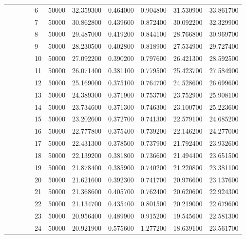 \begin{tabular}{llllllrrrrr}
\cline{5-11}
 &  &  &  & 6 & 50000 & 32.359300 & 0.464000 & 0.904800 & 31.530900 & 33.861700 \\
\cline{5-11}
 &  &  &  & 7 & 50000 & 30.862800 & 0.439600 & 0.872400 & 30.092200 & 32.329900 \\
\cline{5-11}
 &  &  &  & 8 & 50000 & 29.487000 & 0.419200 & 0.844100 & 28.766800 & 30.969700 \\
\cline{5-11}
 &  &  &  & 9 & 50000 & 28.230500 & 0.402800 & 0.818900 & 27.534900 & 29.727400 \\
\cline{5-11}
 &  &  &  & 10 & 50000 & 27.092200 & 0.390200 & 0.797600 & 26.421300 & 28.592500 \\
\cline{5-11}
 &  &  &  & 11 & 50000 & 26.071400 & 0.381100 & 0.779500 & 25.423700 & 27.584900 \\
\cline{5-11}
 &  &  &  & 12 & 50000 & 25.169000 & 0.375100 & 0.764700 & 24.528600 & 26.699600 \\
\cline{5-11}
 &  &  &  & 13 & 50000 & 24.389300 & 0.371900 & 0.753700 & 23.752900 & 25.908100 \\
\cline{5-11}
 &  &  &  & 14 & 50000 & 23.734600 & 0.371300 & 0.746300 & 23.100700 & 25.223600 \\
\cline{5-11}
 &  &  &  & 15 & 50000 & 23.202600 & 0.372700 & 0.741300 & 22.579100 & 24.685200 \\
\cline{5-11}
 &  &  &  & 16 & 50000 & 22.777800 & 0.375400 & 0.739200 & 22.146200 & 24.277000 \\
\cline{5-11}
 &  &  &  & 17 & 50000 & 22.431300 & 0.378500 & 0.737900 & 21.792400 & 23.932600 \\
\cline{5-11}
 &  &  &  & 18 & 50000 & 22.139200 & 0.381800 & 0.736600 & 21.494400 & 23.651500 \\
\cline{5-11}
 &  &  &  & 19 & 50000 & 21.878400 & 0.385900 & 0.740200 & 21.220800 & 23.381100 \\
\cline{5-11}
 &  &  &  & 20 & 50000 & 21.621600 & 0.392300 & 0.741700 & 20.976600 & 23.137600 \\
\cline{5-11}
 &  &  &  & 21 & 50000 & 21.368600 & 0.405700 & 0.762400 & 20.620600 & 22.924300 \\
\cline{5-11}
 &  &  &  & 22 & 50000 & 21.134700 & 0.435400 & 0.801500 & 20.219000 & 22.679600 \\
\cline{5-11}
 &  &  &  & 23 & 50000 & 20.956400 & 0.489900 & 0.915200 & 19.545600 & 22.581300 \\
\cline{5-11}
 &  &  &  & 24 & 50000 & 20.921900 & 0.575600 & 1.277200 & 18.639100 & 23.561700 \\
\cline{5-11}

\end{tabular}
